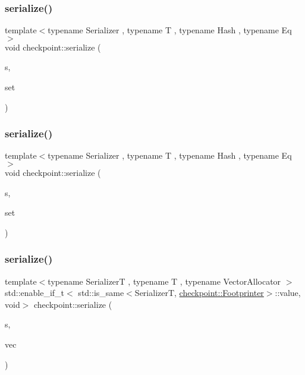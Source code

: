 \subsubsection{\texorpdfstring{serialize()}{serialize()}\hspace{0.1cm}{\footnotesize\ttfamily [26/29]}}
{\footnotesize\ttfamily template$<$typename Serializer , typename T , typename Hash , typename Eq $>$ \\
void checkpoint\+::serialize (\begin{DoxyParamCaption}\item[{\hyperlink{structcheckpoint_1_1_serializer}{Serializer} \&}]{s,  }\item[{std\+::unordered\+\_\+set$<$ T, Hash, Eq $>$ \&}]{set }\end{DoxyParamCaption})\hspace{0.3cm}{\ttfamily [inline]}}

\mbox{\label{namespacecheckpoint_a64c8a1aa29d469bc71c88a8836264ecc}} 
\subsubsection{\texorpdfstring{serialize()}{serialize()}\hspace{0.1cm}{\footnotesize\ttfamily [27/29]}}
{\footnotesize\ttfamily template$<$typename Serializer , typename T , typename Hash , typename Eq $>$ \\
void checkpoint\+::serialize (\begin{DoxyParamCaption}\item[{\hyperlink{structcheckpoint_1_1_serializer}{Serializer} \&}]{s,  }\item[{std\+::unordered\+\_\+multiset$<$ T, Hash, Eq $>$ \&}]{set }\end{DoxyParamCaption})\hspace{0.3cm}{\ttfamily [inline]}}

\mbox{\label{namespacecheckpoint_a3f43839a02cd77538b0d2f4192e926be}} 
\subsubsection{\texorpdfstring{serialize()}{serialize()}\hspace{0.1cm}{\footnotesize\ttfamily [28/29]}}
{\footnotesize\ttfamily template$<$typename SerializerT , typename T , typename Vector\+Allocator $>$ \\
std\+::enable\+\_\+if\+\_\+t$<$ std\+::is\+\_\+same$<$SerializerT, \hyperlink{structcheckpoint_1_1_footprinter}{checkpoint\+::\+Footprinter}$>$\+::value, void$>$ checkpoint\+::serialize (\begin{DoxyParamCaption}\item[{SerializerT \&}]{s,  }\item[{std\+::vector$<$ T, Vector\+Allocator $>$ \&}]{vec }\end{DoxyParamCaption})}

